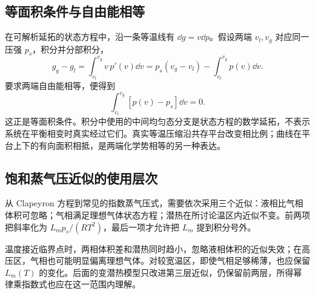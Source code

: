 \subsection{等面积条件与自由能相等}
在可解析延拓的状态方程中，沿一条等温线有 $\dd g=v\dd p$。假设两端 $v_l,v_g$ 对应同一压强 $p_s$，积分并分部积分，
\[
 g_g-g_l=\int_{v_l}^{v_g}v\,p'(v)\dd v
 =p_s(v_g-v_l)-\int_{v_l}^{v_g}p(v)\dd v.
\]
要求两端自由能相等，便得到
\[
 \int_{v_l}^{v_g}[p(v)-p_s]\dd v=0.
\]
这正是等面积条件。积分中使用的中间均匀态分支是状态方程的数学延拓，不表示系统在平衡相变时真实经过它们。真实等温压缩沿共存平台改变相比例；曲线在平台上下的有向面积相抵，是两端化学势相等的另一种表达。

\subsection{饱和蒸气压近似的使用层次}
从 Clapeyron 方程到常见的指数蒸气压式，需要依次采用三个近似：液相比气相体积可忽略；气相满足理想气体状态方程；潜热在所讨论温区内近似不变。前两项把斜率化为 $L_m p_s/(RT^2)$，最后一项才允许把 $L_m$ 提到积分号外。

温度接近临界点时，两相体积差和潜热同时趋小，忽略液相体积的近似失效；在高压区，气相也可能明显偏离理想气体。对较宽温区，即使气相足够稀薄，也应保留 $L_m(T)$ 的变化。后面的变潜热模型只改进第三层近似，仍保留前两层，所得幂律乘指数式也应在这一范围内理解。

